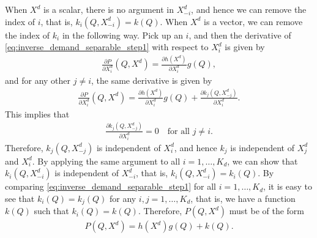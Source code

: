 \documentclass[11pt, a4paper]{article}
\theoremstyle{remark}
\begin{document}
When $X^{d}$ is a scalar, there is no argument in $X^{d}_{-i}$, and hence we can remove the index of $i$, that is, $k_i(Q, X^{d}_{-i}) = k(Q)$.
When $X^{d}$ is a vector, we can remove the index of $k_i$ in the following way.
Pick up an $i$, and then the derivative of \eqref{eq:inverse_demand_separable_step1} with respect to $X^{d}_i$ is given by
\begin{align}
    \frac{\partial P}{\partial X^{d}_i}(Q, X^{d}) = \frac{\partial h(X^{d})}{\partial X^{d}_i} g(Q),
\end{align}
and for any other $j \ne i$, the same derivative is given by
\begin{align}
    \frac{\partial P}{\partial X^{d}_i}(Q, X^{d}) = \frac{\partial h(X^{d})}{\partial X^{d}_i} g(Q) + \frac{\partial k_j(Q, X^{d}_{-j})}{\partial X^{d}_i}.
\end{align}
This implies that
\begin{align}
    \frac{\partial k_j(Q, X^{d}_{-j})}{\partial X^{d}_i} = 0 \quad \text{for all } j \ne i.
\end{align}
Therefore, $k_j(Q, X^{d}_{-j})$ is independent of $X^{d}_i$, and hence $k_j$ is independent of $X^{d}_j$ and $X^{d}_i$.
By applying the same argument to all $i = 1, \ldots, K_d$, we can show that $k_i(Q, X^{d}_{-i})$ is independent of $X^{d}_{-i}$, that is, $k_i(Q, X^{d}_{-i}) = k_i(Q)$.
By comparing \eqref{eq:inverse_demand_separable_step1} for all $i = 1, \ldots, K_d$, it is easy to see that $k_i(Q) = k_j(Q)$ for any $i,j = 1, \ldots, K_d$, that is, we have a function $k(Q)$ such that $k_i(Q) = k(Q)$.
Therefore, $P(Q, X^{d})$ must be of the form
\begin{align}
    P(Q, X^{d}) = h(X^{d})g(Q) + k(Q). \label{eq:inverse_demand_separable_c_i_constant}
\end{align}
\end{document}
